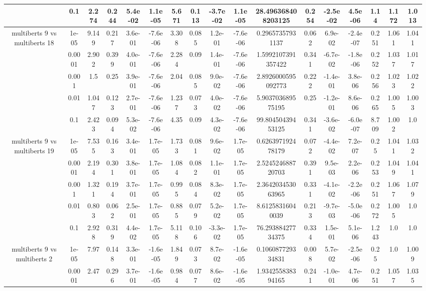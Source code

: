 \begin{tabular}{|c|c|c|c|c|c|c|c|c|c|c|c|c|c|c|c|c|}
 & 0.1 & 2.274 & 0.244 & 5.4e-02 & 1.1e-05 & 5.671 & 0.113 & -3.7e-02 & 1.1e-05 & 28.496368408203125 & 0.254 & -2.5e-02 & 4.5e-06 & 1.14 & 1.172 & 1.013 \\
\hline
\multirow{5}{*}{multiberts 9 vs multiberts 18} & 1e-05 & 9.149 & 0.217 & 3.6e-01 & -7.6e-06 & 3.308 & 0.085 & 1.2e-01 & -7.6e-06 & 0.29657357931137 & 0.062 & 6.9e-02 & -2.4e-07 & 0.251 & 1.061 & 1.041 \\
 & 0.0001 & 2.902 & 0.399 & 4.0e-01 & -7.6e-06 & 2.284 & 0.09 & 1.4e-01 & -7.6e-06 & 1.5992107391357422 & 0.341 & -6.7e-02 & -1.8e-06 & 0.252 & 1.037 & 1.017 \\
 & 0.001 & 1.5 & 0.25 & 3.9e-01 & -7.6e-06 & 2.04 & 0.085 & 9.0e-02 & -7.6e-06 & 2.8926000595092773 & 0.222 & -1.4e-01 & 3.8e-06 & 0.256 & 1.023 & 1.022 \\
 & 0.01 & 1.047 & 0.123 & 2.7e-01 & -7.6e-06 & 1.237 & 0.073 & 4.0e-02 & -7.6e-06 & 5.903703689575195 & 0.25 & -1.2e-01 & 8.6e-06 & 0.265 & 1.005 & 1.003 \\
 & 0.1 & 2.423 & 0.094 & 5.3e-02 & -7.6e-06 & 4.35 & 0.09 & 4.3e-02 & -7.6e-06 & 99.80450439453125 & 0.341 & -3.6e-02 & -6.0e-07 & 8.709 & 1.002 & 1.0 \\
\hline
\multirow{5}{*}{multiberts 9 vs multiberts 19} & 1e-05 & 7.535 & 0.163 & 3.4e-01 & 1.7e-05 & 1.733 & 0.081 & 9.6e-02 & 1.7e-05 & 0.626397192478179 & 0.072 & -4.4e-02 & 7.2e-07 & 0.25 & 1.041 & 1.032 \\
 & 0.0001 & 2.194 & 0.301 & 3.8e-01 & 1.7e-05 & 1.084 & 0.082 & 1.1e-01 & 1.7e-05 & 2.524524688720703 & 0.391 & 9.5e-03 & 2.2e-06 & 0.253 & 1.049 & 1.041 \\
 & 0.001 & 1.321 & 0.194 & 3.7e-01 & 1.7e-05 & 0.995 & 0.084 & 8.3e-02 & 1.7e-05 & 2.364203453063965 & 0.331 & -4.1e-02 & -2.2e-06 & 0.251 & 1.067 & 1.079 \\
 & 0.01 & 0.803 & 0.062 & 2.5e-01 & 1.7e-05 & 0.885 & 0.079 & 5.2e-02 & 1.7e-05 & 8.61258316040039 & 0.213 & -9.7e-03 & -5.0e-06 & 0.272 & 1.005 & 1.0 \\
 & 0.1 & 2.928 & 0.319 & 4.4e-02 & 1.7e-05 & 5.118 & 0.106 & -3.3e-02 & 1.7e-05 & 76.29388427734375 & 0.334 & 1.5e-01 & 5.1e-06 & 1.243 & 1.0 & 1.0 \\
\hline
\multirow{5}{*}{multiberts 9 vs multiberts 2} & 1e-05 & 7.97 & 0.148 & 3.3e-01 & -1.6e-05 & 1.849 & 0.073 & 8.7e-02 & -1.6e-05 & 0.106087729334831 & 0.008 & 5.7e-02 & -2.5e-06 & 0.25 & 1.0 & 1.009 \\
 & 0.0001 & 2.47 & 0.296 & 3.7e-01 & -1.6e-05 & 0.984 & 0.077 & 8.6e-02 & -1.6e-05 & 1.934255838394165 & 0.241 & -1.0e-01 & 4.7e-06 & 0.251 & 1.057 & 1.035 \\

\end{tabular}
